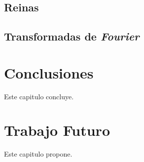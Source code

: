 \documentclass[a4paper]{report}
\begin{document}
\section{Reinas}

\section{Transformadas de {\it Fourier}}

\chapter{Conclusiones}

Este capitulo concluye.

\chapter{Trabajo Futuro}

Este capitulo propone.
\end{document}
